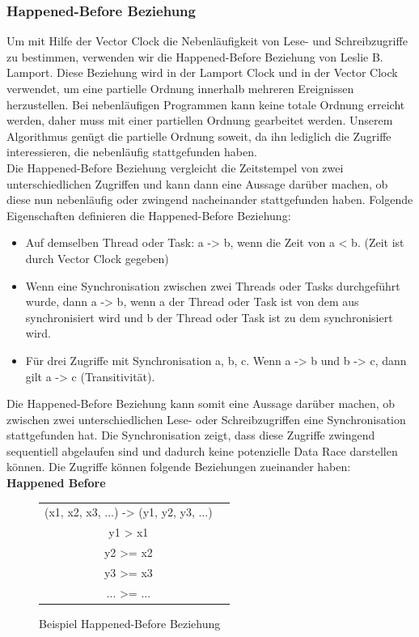 \documentclass[10pt,a4paper]{article}
\begin{document}
\subsubsection{Happened-Before Beziehung}
\begin{flushleft}
Um mit Hilfe der Vector Clock die Nebenläufigkeit von Lese- und Schreibzugriffe zu bestimmen, verwenden wir die Happened-Before Beziehung von Leslie B. Lamport. Diese Beziehung wird in der Lamport Clock und in der Vector Clock verwendet, um eine partielle Ordnung innerhalb mehreren Ereignissen herzustellen. Bei nebenläufigen Programmen kann keine totale Ordnung erreicht werden, daher muss mit einer partiellen Ordnung gearbeitet werden. Unserem Algorithmus genügt die partielle Ordnung soweit, da ihn lediglich die Zugriffe interessieren, die nebenläufig stattgefunden haben. \\
Die Happened-Before Beziehung vergleicht die Zeitstempel von zwei unterschiedlichen Zugriffen und kann dann eine Aussage darüber machen, ob diese nun nebenläufig oder zwingend nacheinander stattgefunden haben. Folgende Eigenschaften definieren die Happened-Before Beziehung:
\begin{itemize}
\item Auf demselben Thread oder Task: a -> b, wenn die Zeit von a < b. (Zeit ist durch Vector Clock gegeben)
\item Wenn eine Synchronisation zwischen zwei Threads oder Tasks durchgeführt wurde, dann a -> b, wenn a der Thread oder Task ist von dem aus synchronisiert wird und b der Thread oder Task ist zu dem synchronisiert wird.
\item Für drei Zugriffe mit Synchronisation a, b, c. Wenn a -> b und b -> c, dann gilt a -> c (Transitivität).
\end{itemize}
Die Happened-Before Beziehung kann somit eine Aussage darüber machen, ob zwischen zwei unterschiedlichen Lese- oder Schreibzugriffen eine Synchronisation stattgefunden hat. Die Synchronisation zeigt, dass diese Zugriffe zwingend sequentiell abgelaufen sind und dadurch keine potenzielle Data Race darstellen können. Die Zugriffe können folgende Beziehungen zueinander haben:\\[0.5cm]
\textbf{ Happened Before}\\[0.2cm]
\end{flushleft}
\begin{figure}[H]
\begin{center}
\begin{tabular}{ c c }
  (x1, x2, x3, ...) -> (y1, y2, y3, ...) \\
  y1 > x1 \\
  y2 >= x2 \\
  y3 >= x3 \\
  ... >= ...
  \end{tabular}
\end{center}
\caption{Beispiel Happened-Before Beziehung}\label{example_happenedbefore}
\end{figure}
\end{document}
